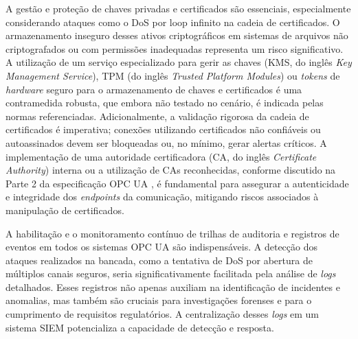         A gestão e proteção de chaves privadas e certificados são essenciais, especialmente considerando ataques como o DoS por loop infinito na cadeia de certificados. O armazenamento inseguro desses ativos criptográficos em sistemas de arquivos não criptografados ou com permissões inadequadas representa um risco significativo. A utilização de um serviço especializado para gerir as chaves (KMS, do inglês \textit{Key Management Service}), TPM (do inglês \textit{Trusted Platform Modules}) ou \textit{tokens} de \textit{hardware} seguro para o armazenamento de chaves e certificados é uma contramedida robusta, que embora não testado no cenário, é indicada pelas normas referenciadas. Adicionalmente, a validação rigorosa da cadeia de certificados é imperativa; conexões utilizando certificados não confiáveis ou autoassinados devem ser bloqueadas ou, no mínimo, gerar alertas críticos. A implementação de uma autoridade certificadora (CA, do inglês \textit{Certificate Authority}) interna ou a utilização de CAs reconhecidas, conforme discutido na Parte 2 da especificação OPC UA \cite{opc2024}, é fundamental para assegurar a autenticidade e integridade dos \textit{endpoints} da comunicação, mitigando riscos associados à manipulação de certificados.


        A habilitação e o monitoramento contínuo de trilhas de auditoria e registros de eventos em todos os sistemas OPC UA são indispensáveis. A detecção dos ataques realizados na bancada, como a tentativa de DoS por abertura de múltiplos canais seguros, seria significativamente facilitada pela análise de \textit{logs} detalhados. Esses registros não apenas auxiliam na identificação de incidentes e anomalias, mas também são cruciais para investigações forenses e para o cumprimento de requisitos regulatórios. A centralização desses \textit{logs} em um sistema SIEM potencializa a capacidade de detecção e resposta.

